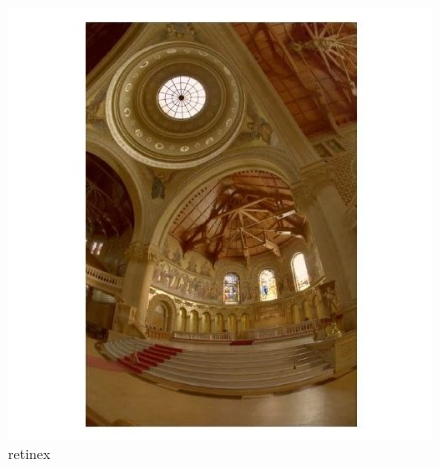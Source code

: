         
    \begin{figure}[!htb]
        	\includegraphics[width=\linewidth]{images/retinex3}
        	\caption{retinex}\label{fig:logtonemap}
      \endminipage\hfill
    \end{figure}
        
